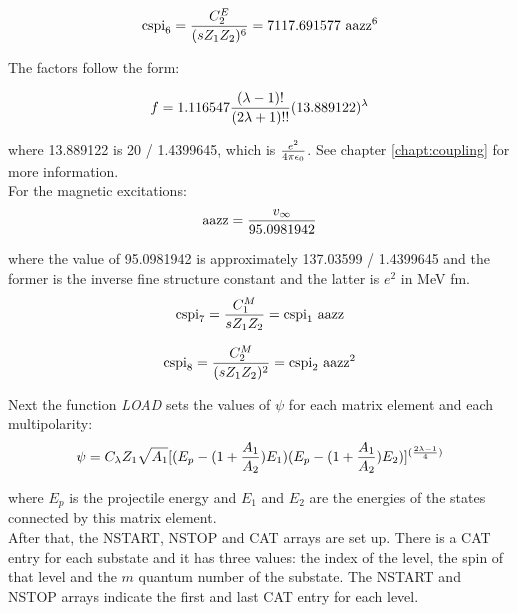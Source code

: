 \begin{equation}
\mathrm{cspi}_6 = {C_2^E \over (s Z_1 Z_2)^6} = 7117.691577 ~\mathrm{aazz}^6
\end{equation}

\noindent The factors follow the form:

\begin{equation}
f = 1.116547 {(\lambda - 1)! \over (2 \lambda + 1)!!} (13.889122)^{\lambda}
\end{equation}

\noindent where 13.889122 is 20 / 1.4399645, which is ${e^2 \over 4 \pi
\epsilon_0}$. See chapter \ref{chapt:coupling} for more information.\\

\noindent For the magnetic excitations:\\

\begin{equation}
\mathrm{aazz} = {v_\infty \over 95.0981942}
\end{equation}

\noindent where the value of 95.0981942 is approximately 137.03599 /
1.4399645 and the former is the inverse fine structure constant and the
latter is $e^2$ in MeV fm.\\

\begin{equation}
\mathrm{cspi}_7 = {C_1^M \over s Z_1 Z_2} = \mathrm{cspi}_1 ~\mathrm{aazz}
\end{equation}

\begin{equation}
\mathrm{cspi}_8 = {C_2^M \over (s Z_1 Z_2)^2} = \mathrm{cspi}_2 ~\mathrm{aazz}^2
\end{equation}

\noindent Next the function {\em LOAD} sets the values of $\psi$ for each
matrix element and each multipolarity:\\

\begin{equation}
\psi = C_\lambda Z_1 \sqrt{A_1} \large[(E_p - (1 + {A_1 \over A_2}) E_1)
(E_p - (1 + {A_1 \over A_2}) E_2)\large]^{({2 \lambda - 1 \over 4})}
\end{equation}

\noindent where $E_p$ is the projectile energy and $E_1$ and $E_2$ are the
energies of the states connected by this matrix element.\\

\noindent After that, the NSTART, NSTOP and CAT arrays are set up. There is
a CAT entry for each substate and it has three values: the index of the
level, the spin of that level and the $m$ quantum number of the substate.
The NSTART and NSTOP arrays indicate the first and last CAT entry for each
level.\\


